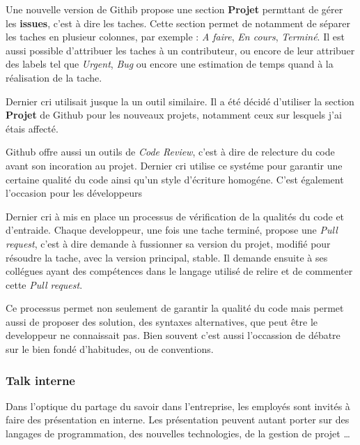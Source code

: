 \documentclass[12pt,a4paper]{article}
\begin{document}
  Une nouvelle version de Githib propose une section \textbf{Projet}
  permttant de gérer les \textbf{issues}, c'est à dire les taches. Cette
  section permet de notamment de séparer les taches en plusieur colonnes,
  par exemple : \emph{A faire}, \emph{En cours}, \emph{Terminé}. Il est
  aussi possible d'attribuer les taches à un contributeur, ou encore de
  leur attribuer des labels tel que \emph{Urgent}, \emph{Bug} ou encore
  une estimation de temps quand à la réalisation de la tache.

  \bigskip

  Dernier cri utilisait jusque la un outil similaire. Il a été décidé
  d'utiliser la section \textbf{Projet} de Github pour les nouveaux
  projets, notamment ceux sur lesquels j'ai étais affecté.

  \bigskip

  Github offre aussi un outils de \emph{Code Review}, c'est à dire de
  relecture du code avant son incoration au projet. Dernier cri utilise ce
  systéme pour garantir une certaine qualité du code ainsi qu'un style
  d'écriture homogéne. C'est également l'occasion pour les développeurs

  \bigskip

  Dernier cri à mis en place un processus de vérification de la qualités
  du code et d'entraide. Chaque developpeur, une fois une tache terminé,
  propose une \emph{Pull request}, c'est à dire demande à fussionner sa
  version du projet, modifié pour résoudre la tache, avec la version
  principal, stable. Il demande ensuite à ses collégues ayant des
  compétences dans le langage utilisé de relire et de commenter cette
  \emph{Pull request}.

  \bigskip

  Ce processus permet non seulement de garantir la qualité du code mais
  permet aussi de proposer des solution, des syntaxes alternatives, que
  peut être le developpeur ne connaissait pas. Bien souvent c'est aussi
  l'occassion de débatre sur le bien fondé d'habitudes, ou de conventions.

  \bigskip

  \subsubsection{Talk interne}\label{talk-interne}

  \bigskip

  Dans l'optique du partage du savoir dans l'entreprise, les employés sont
  invités à faire des présentation en interne. Les présentation peuvent
  autant porter sur des langages de programmation, des nouvelles
  technologies, de la gestion de projet \ldots{}
\end{document}
